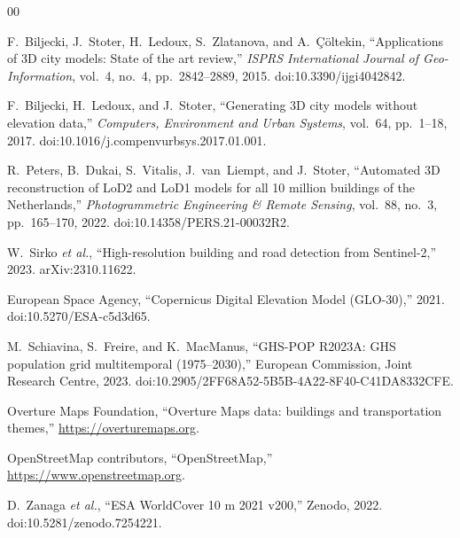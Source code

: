 \documentclass[journal]{IEEEtran}
\begin{document}
\begin{thebibliography}{00}

 F.~Biljecki, J.~Stoter, H.~Ledoux, S.~Zlatanova, and A.~\c{C}\"oltekin, ``Applications of 3D
city models: State of the art review,'' \emph{ISPRS International Journal of Geo-Information}, vol.~4, no.~4,
pp.~2842--2889, 2015. doi:10.3390/ijgi4042842.

 F.~Biljecki, H.~Ledoux, and J.~Stoter, ``Generating 3D city models without elevation data,''
\emph{Computers, Environment and Urban Systems}, vol.~64, pp.~1--18, 2017.
doi:10.1016/j.compenvurbsys.2017.01.001.

 R.~Peters, B.~Dukai, S.~Vitalis, J.~van~Liempt, and J.~Stoter, ``Automated 3D reconstruction of
LoD2 and LoD1 models for all 10 million buildings of the Netherlands,'' \emph{Photogrammetric Engineering \&
Remote Sensing}, vol.~88, no.~3, pp.~165--170, 2022. doi:10.14358/PERS.21-00032R2.

 W.~Sirko \emph{et al.}, ``High-resolution building and road detection from Sentinel-2,'' 2023.
arXiv:2310.11622.

 European Space Agency, ``Copernicus Digital Elevation Model (GLO-30),'' 2021.
doi:10.5270/ESA-c5d3d65.

 M.~Schiavina, S.~Freire, and K.~MacManus, ``GHS-POP R2023A: GHS population grid multitemporal
(1975--2030),'' European Commission, Joint Research Centre, 2023. doi:10.2905/2FF68A52-5B5B-4A22-8F40-C41DA8332CFE.

 Overture Maps Foundation, ``Overture Maps data: buildings and transportation themes,''
\url{https://overturemaps.org}.

 OpenStreetMap contributors, ``OpenStreetMap,'' \url{https://www.openstreetmap.org}.

 D.~Zanaga \emph{et al.}, ``ESA WorldCover 10 m 2021 v200,'' Zenodo, 2022.
doi:10.5281/zenodo.7254221.

\end{thebibliography}
\end{document}
